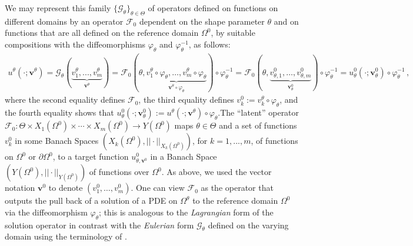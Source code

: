 \documentclass[review]{elsarticle}
\def\Omegatheta{{\Omega^\theta}}
\def\refd{0}
\def\Omegaref{{\Omega^\refd}}
\def\vv0thetak{v^\refd_{k}}
\def\u0theta{u^\refd_{\theta}(\cdot;\mathbf{v}^\refd_\theta)}
\def\bfvtheta{\mathbf{v}^\theta}
\def\F0{{\mathcal{F}_{\refd}}}
\begin{document}
We may represent this family $\{\mathcal{G}_{\theta}\}_{\theta\in\Theta}$ of operators defined on functions on different domains by an operator $\F0$ dependent on the shape parameter $\theta$ and on functions that are all defined on the reference domain $\Omegaref$, by suitable compositions with the diffeomorphisms $\varphi_\theta$ and $\varphi_\theta^{-1}$, as follows:
\begin{align}
    u^{\theta}(\cdot;\mathbf{v}^\theta)
    = \mathcal{G}_{\theta}(\underbrace{v^{\theta}_{1},...,v^{\theta}_{m}}_{\bfvtheta})
    = \F0(\theta,     \underbrace{v^\theta_1\circ\varphi_{\theta},\dots,v^\theta_m\circ\varphi_{\theta}}_{\bfvtheta \circ \varphi_{\theta}})\circ \varphi_{\theta}^{-1}
    = \F0(\theta, \underbrace{v_{\theta,1}^\refd,\dots,v_{\theta,m}^\refd}_{\mathbf{v}^{0}_{\theta}})\circ \varphi_{\theta}^{-1} 
    = \u0theta\circ\varphi_{\theta}^{-1}\, ,
\label{e:defF0}
\end{align}
where the second equality defines $\F0$, the third equality defines $\vv0thetak:=v_k^\theta\circ\varphi_{\theta}$, and the fourth equality shows that $\u0theta:=u^{\theta}(\cdot;\mathbf{v}^\theta)\circ\varphi_{\theta}$.The ``latent'' operator $\F0: \Theta \times X_{1}(\Omegaref)\times \cdots \times X_{m}(\Omegaref) \rightarrow Y(\Omegaref)$ maps $\theta\in \Theta$ and a set of functions $v^{\refd}_{k}$ in some Banach Spaces $(X_{k}(\Omegaref), ||\cdot||_{X_{k}(\Omegaref)})$, for $k=1,...,m$, of functions on $\Omegaref$ or $\partial\Omegaref$, to a target function $u^\refd_{\theta,\mathbf{v}^\refd}$ in a Banach Space $(Y(\Omegaref),||\cdot||_{Y(\Omegaref)})$ of functions over $\Omegaref$. As above, we used the vector notation $\mathbf{v}^\refd$ to denote $(v^\refd_1,\dots,v^\refd_m)$. One can view $\F0$ as the operator that outputs the pull back of a solution of a PDE on $\Omegatheta$ to the reference domain $\Omegaref$ via the diffeomorphism $\varphi_{\theta}$; this is analogous to the \textit{Lagrangian} form of the solution operator in contrast with the \textit{Eulerian} form $\mathcal{G}_{\theta}$ defined on the varying domain using the terminology of \cite{henry2005perturbation}.  
\end{document}
